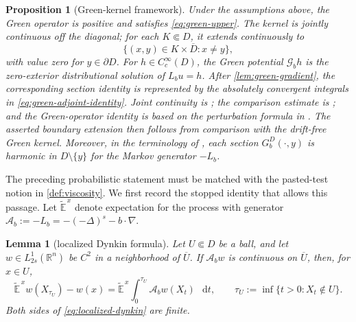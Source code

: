 \documentclass[10pt,a4paper]{amsart}
\numberwithin{equation}{section}
\newtheorem{lemma}[theorem]{Lemma}
\newtheorem{proposition}[theorem]{Proposition}
\newcommand{\R}{\mathbb R}
\newcommand{\differential}{\mathop{}\!\mathrm d}
\newcommand{\Lb}{L_b}
\newcommand{\rev}[1]{#1}
\begin{document}
\begin{proposition}[Green-kernel framework]\label{prop:green-framework}
Under the assumptions above, the Green operator is positive and satisfies
\eqref{eq:green-upper}.  \rev{The kernel is jointly continuous off the
diagonal; for each $K\Subset D$, it extends continuously to
\[
 \{(x,y)\in K\times\overline D:x\ne y\},
\]
with value zero for $y\in\partial D$.}  For $h\in C_c^\infty(D)$, the
Green potential $\mathcal G_bh$ is the zero-exterior distributional solution of
$\Lb u=h$.  \rev{After \cref{lem:green-gradient}, the corresponding
section identity is represented by the absolutely convergent integrals in
\eqref{eq:green-adjoint-identity}.  Joint continuity is
\cite[Lemma~7]{BogdanJakubowski2012}; the comparison estimate is
\cite[Theorem~1]{BogdanJakubowski2012}; and the Green-operator identity is
based on the perturbation formula in
\cite[Section~3]{BogdanJakubowski2012}.  The asserted boundary extension
then follows from comparison with the drift-free Green kernel.  Moreover,
in the terminology of \cite[Definition~2]{BogdanJakubowski2012}, each
section $G_b^D(\cdot,y)$ is harmonic in $D\setminus\{y\}$ for the Markov
generator $-L_b$.}
\end{proposition}

\begingroup
The preceding probabilistic statement must be matched with the pasted-test
notion in \cref{def:viscosity}.  We first record the stopped identity that
allows this passage.  Let $\widetilde{\mathbb E}^{\,x}$ denote expectation
for the process with generator
$\mathcal A_b:=-L_b=-(-\Delta)^s-b\cdot\nabla$.

\begin{lemma}[localized Dynkin formula]\label{lem:localized-dynkin}
Let $U\Subset D$ be a ball, and let
$w\in L^1_{2s}(\R^n)$ be $C^2$ in a neighborhood of $\overline U$.
If $\mathcal A_bw$ is continuous on $\overline U$, then, for $x\in U$,
\begin{equation}\label{eq:localized-dynkin}
 \widetilde{\mathbb E}^{\,x}w(X_{\tau_U})-w(x)
 =\widetilde{\mathbb E}^{\,x}\int_0^{\tau_U}
   \mathcal A_bw(X_t)\,\differential t,
 \qquad
 \tau_U:=\inf\{t>0:X_t\notin U\}.
\end{equation}
Both sides of \eqref{eq:localized-dynkin} are finite.
\end{lemma}
\end{document}
